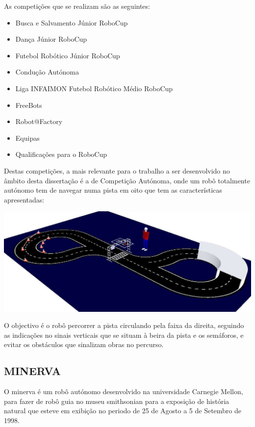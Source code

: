 As competições que se realizam são as seguintes:
\begin{itemize}
\item    Busca e Salvamento Júnior RoboCup
\item    Dança Júnior RoboCup
\item    Futebol Robótico Júnior RoboCup
\item    Condução Autónoma
\item    Liga INFAIMON Futebol Robótico Médio RoboCup
\item    FreeBots
\item    Robot@Factory
\item    Equipas
\item    Qualificações para o RoboCup
\end{itemize}

Destas competições, a mais relevante para o trabalho a ser desenvolvido no 
âmbito desta dissertação é a de Competição Autónoma, onde um robô totalmente 
autónomo tem de navegar numa pista em oito que tem as características apresentadas:

\begin{center}
	\includegraphics[width=1.00\textwidth]{figures/ca_pista.png}
	\label{fig:3}
\end{center}

O objectivo é o robô percorrer a pista circulando pela faixa da direita, seguindo
as indicações no sinais verticais que se situam à beira da pista e os semáforos,
e evitar os obstáculos que sinalizam obras no percurso.


\subsection{MINERVA}
O minerva é um robô autónomo desenvolvido na universidade Carnegie Mellon, para
fazer de robô guia no museu smithsonian para a exposição de história natural que
esteve em exibição no periodo de 25 de Agosto a 5 de Setembro de 1998.

